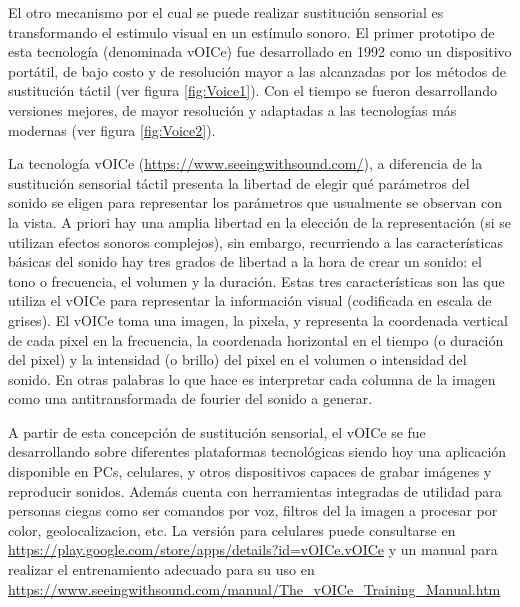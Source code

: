 \documentclass{article}
\numberwithin{figure}{section}
\begin{document}
    
    El otro mecanismo por el cual se puede realizar sustitución sensorial es transformando el estimulo visual en un estímulo sonoro. El primer prototipo de esta tecnología (denominada vOICe) fue desarrollado en 1992 \cite{Voice1} como un dispositivo portátil, de bajo costo y de resolución mayor a las alcanzadas por los métodos de sustitución táctil (ver figura \ref{fig:Voice1}). Con el tiempo se fueron desarrollando versiones mejores, de mayor resolución y adaptadas a las tecnologías más modernas (ver figura \ref{fig:Voice2}).
    
    La tecnología vOICe (\url{https://www.seeingwithsound.com/}), a diferencia de la sustitución sensorial táctil presenta la libertad de elegir qué parámetros del sonido se eligen para representar los parámetros que usualmente se observan con la vista. A priori hay una amplia libertad en la elección de la representación (si se utilizan efectos sonoros complejos), sin embargo, recurriendo a las características básicas del sonido hay tres grados de libertad a la hora de crear un sonido: el tono o frecuencia, el volumen y la duración. Estas tres características son las que utiliza el vOICe para representar la información visual (codificada en escala de grises). El vOICe toma una imagen, la pixela, y representa la coordenada vertical de cada pixel en la frecuencia, la coordenada horizontal en el tiempo (o duración del pixel) y la intensidad (o brillo) del pixel en el volumen o intensidad del sonido. En otras palabras lo que hace es interpretar cada columna de la imagen como una antitransformada de fourier del sonido a generar. 
    
    A partir de esta concepción de sustitución sensorial, el vOICe se fue desarrollando sobre diferentes plataformas tecnológicas siendo hoy una aplicación disponible en PCs, celulares, y otros dispositivos capaces de grabar imágenes y reproducir sonidos. Además cuenta con herramientas integradas de utilidad para personas ciegas como ser comandos por voz, filtros del la imagen a procesar por color, geolocalizacion, etc. La versión para celulares puede consultarse en \url{https://play.google.com/store/apps/details?id=vOICe.vOICe} y un manual para realizar el entrenamiento adecuado para su uso en \url {https://www.seeingwithsound.com/manual/The_vOICe_Training_Manual.htm} 
    
\end{document}
